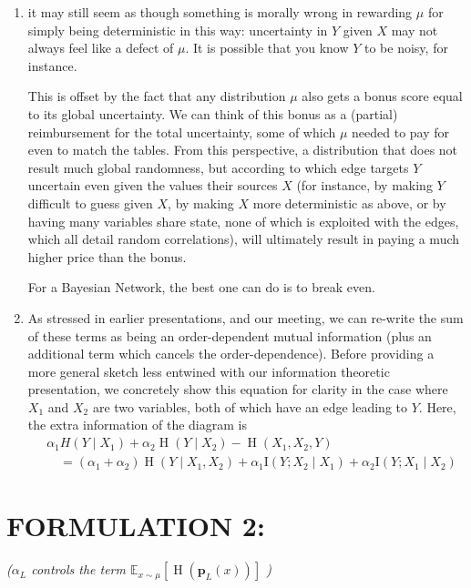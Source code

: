 \documentclass{article}
\renewcommand{\H}{\mathop{\mathrm H}}
\begin{document}
\begin{enumerate}
\item it may still seem as though something is morally wrong in rewarding $\mu$ for simply being deterministic in this way: uncertainty in $Y$ given $X$ may not always feel like a defect of $\mu$. It is possible that you know $Y$ to be 
noisy, for instance.

This is offset by the fact that any distribution $\mu$ also gets a bonus score equal to its global uncertainty. We can think of this bonus as a (partial) reimbursement for the total uncertainty, some of which $\mu$ needed to pay for even to match the tables. From this perspective, a distribution that does not result much global randomness, but according to which edge targets $Y$ uncertain even given the values their sources $X$ (for instance, by making $Y$ difficult to guess given $X$, by making $X$ more deterministic as above, or by having many variables share state, none of which is exploited with the edges, which all detail random correlations), will ultimately result in paying a much higher price than the bonus. 

For a Bayesian Network, the best one can do is to break even.

\item As stressed in earlier presentations, and our meeting, we can re-write the sum of these terms as being an order-dependent mutual information (plus an additional term which cancels the order-dependence). Before providing a more general sketch less entwined with our information theoretic presentation, we concretely show this equation for clarity in the case where $X_1$ and $X_2$ are two variables, both of which have an edge leading to $Y$. Here, the extra information of the diagram is
\begin{align*}
	&\alpha_1 H(Y \mid X_1) + \alpha_2 \H(Y \mid X_2) - \H(X_1,X_2,Y) \\
	&\quad = (\alpha_1+ \alpha_2) \H(Y \mid X_1, X_2) + \alpha_1 \mathrm{I}(Y; X_2 \mid X_1 )+ \alpha_2 \mathrm{I}(Y ; X_1 \mid X_2)
\end{align*}

\end{enumerate}



\section*{FORMULATION 2:}%
\hspace{1in}\textit{($\alpha_L$ controls the term $\mathbb E_{x \sim \mu} [ \H (\mathbf p_L(x)) ]$ )}
\end{document}
